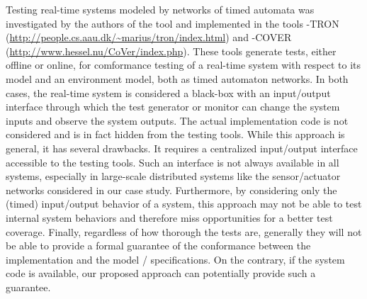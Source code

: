 Testing real-time systems modeled by networks of timed automata was
investigated by the authors of the tool \uppaal
\cite{uppaaltron2008,uppaalcover2007,uppaaltron2005} and implemented
in the tools \uppaal-TRON
(\url{http://people.cs.aau.dk/~marius/tron/index.html}) and
\uppaal-COVER
 (\url{http://www.hessel.nu/CoVer/index.php}).  These tools generate
tests, either offline or online, for comformance testing of a
real-time system with respect to its model and an environment model,
both as timed automaton networks.  In both cases, the real-time system
is considered a black-box with an input/output interface through which
the test generator or monitor can change the system inputs and observe
the system outputs.  The actual implementation code is not considered
and is in fact hidden from the testing tools.  While this approach is
general, it has several drawbacks.  It requires a centralized
input/output interface accessible to the testing tools.  Such an
interface is not always available in all systems, especially in
large-scale distributed systems like the sensor/actuator networks
considered in our case study.  Furthermore, by considering only the
(timed) input/output behavior of a system, this approach may not be
able to test internal system behaviors and therefore miss
opportunities for a better test
coverage.  %
Finally, regardless of how thorough the tests are, generally they will
not be able to provide a formal guarantee of the conformance between
the implementation and the model / specifications.  On the contrary,
if the system code is available, our proposed
approach can potentially provide such a
guarantee.



